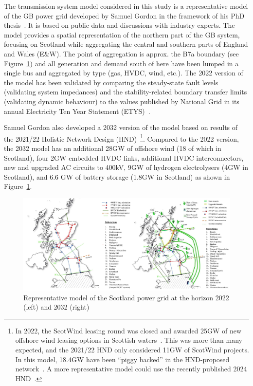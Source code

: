 The transmission system model considered in this study is a representative model of the GB power grid developed by Samuel Gordon in the framework of his PhD thesis~\cite{Sam_thesis}. It is based on public data and discussions with industry experts. The model provides a spatial representation of the northern part of the GB system, focusing on Scotland while aggregating the central and southern parts of England and Wales (E\&W). The point of aggregation is approx. the B7a boundary (see Figure~\ref{fig:scotland_model}) and all generation and demand south of here have been lumped in a single bus and aggregated by type (gas, HVDC, wind, etc.). The 2022 version of the model has been validated by comparing the steady-state fault levels (validating system impedances) and the stability-related boundary transfer limits (validating dynamic behaviour) to the values published by National Grid in its annual Electricity Ten Year Statement (ETYS)~\cite{ETYS}.

Samuel Gordon also developed a 2032 version of the model based on results of the 2021/22 Holistic Network Design (HND)~\cite{HND_2022}\footnote{In 2022, the ScotWind leasing round was closed and awarded 25GW of new offshore wind leasing options in Scottish waters~\cite{scotwind_2022}. This was more than many expected, and the 2021/22 HND only considered 11GW of ScotWind projects. In this model, 18.4GW have been ``piggy backed'' in the HND-proposed network~\cite{HND_2022}. A more representative model could use the recently published 2024 HND~\cite{HND_2024}.}. Compared to the 2022 version, the 2032 model has an additional 28GW of offshore wind (18 of which in Scotland), four 2GW embedded HVDC links, additional HVDC interconnectors, new and upgraded AC circuits to 400kV, 9GW of hydrogen electrolysers (4GW in Scotland), and 6.6 GW of battery storage (1.8GW in Scotland) as shown in Figure~\ref{fig:scotland_model}.

\begin{figure}
    \centering
    \includegraphics[width=\linewidth]{Figs/Scotland_model.pdf}
    \caption{Representative model of the Scotland power grid at the horizon 2022 (left) and 2032 (right)~\cite{Sam_thesis}}
    \label{fig:scotland_model}
\end{figure}

